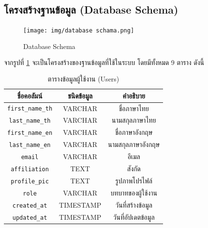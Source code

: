 \newpage
\subsection{โครงสร้างฐานข้อมูล (Database Schema)}
\begin{figure}[hb]
    \begin{center}
        \texttt{[image: img/database schama.png]}
    \end{center}
    \caption{Database Schema}
    \label{fig:data_schema}
\end{figure}
จากรูปที่ \ref{fig:data_schema} จะเป็นโครงสร้างของฐานข้อมูลที่ใช้ในระบบ โดยมีทั้งหมด 9  ตาราง ดังนี้


\begin{table}[hb]
    \centering
    \begin{tabular}{|c|c|c|}
        \hline
        ชื่อคอลัมน์               & ชนิดข้อมูล   & คำอธิบาย          \\ \hline
        \verb |first_name_th| & VARCHAR   & ชื่อภาษาไทย       \\ \hline
        \verb |last_name_th|  & VARCHAR   & นามสกุลภาษาไทย   \\ \hline
        \verb |first_name_en| & VARCHAR   & ชื่อภาษาอังกฤษ     \\ \hline
        \verb |last_name_en|  & VARCHAR   & นามสกุลภาษาอังกฤษ \\ \hline
        \verb |email|         & VARCHAR   & อีเมล            \\ \hline
        \verb |affiliation|   & TEXT      & สังกัด            \\ \hline
        \verb |profile_pic|   & TEXT      & รูปภาพโปรไฟล์     \\ \hline
        \verb |role|          & VARCHAR   & บทบาทของผู้ใช้งาน  \\ \hline
        \verb |created_at|    & TIMESTAMP & วันที่สร้างข้อมูล     \\ \hline
        \verb |updated_at|    & TIMESTAMP & วันที่อัปเดตข้อมูล    \\ \hline
    \end{tabular}
    \caption{ตารางข้อมูลผู้ใช้งาน (Users)}
    \label{tab:user_data}
\end{table}


